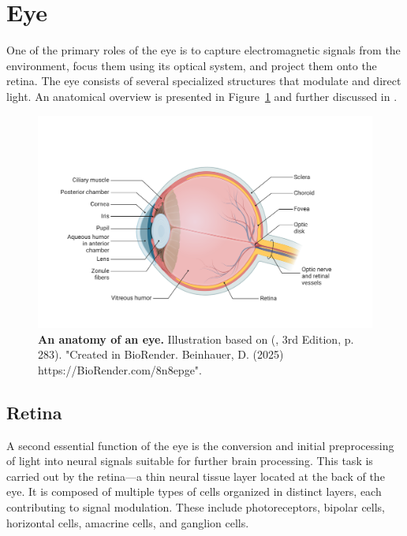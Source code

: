 \section{Eye}
\label{sec:eye}

One of the primary roles of the eye is to capture electromagnetic signals from the environment, focus them using its optical system, and project them onto the retina. The eye consists of several specialized structures that modulate and direct light. An anatomical overview is presented in Figure~\ref{fig:eye} and further discussed in \citet{bear2020neuroscience, snell2013clinical}.

\begin{figure}
    \centering
    \includegraphics[width=\linewidth]{img/eye.pdf}
    \caption{\textbf{An anatomy of an eye.} Illustration based on (\citet{bear2020neuroscience}, 3rd Edition, p. 283). "Created in BioRender. Beinhauer, D. (2025) https://BioRender.com/8n8epge".}
    \label{fig:eye}
\end{figure}

\subsection{Retina}
\label{subsec:retina}

A second essential function of the eye is the conversion and initial preprocessing of light into neural signals suitable for further brain processing. This task is carried out by the retina—a thin neural tissue layer located at the back of the eye. It is composed of multiple types of cells organized in distinct layers, each contributing to signal modulation. These include photoreceptors, bipolar cells, horizontal cells, amacrine cells, and ganglion cells.

